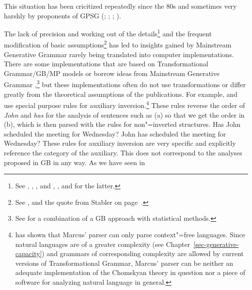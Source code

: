 This situation has been cricitized repeatedly since the 80s and sometimes very harshly by proponents of GPSG 
(\citealp*[]{GKPS85a};
\citealp{Pullum85a,Pullum89b}; \citealp[]{Pullum91b}; \citealp{KP90a}). 

The lack of precision and working out of the details\footnote{
	See \eg {}, , ,  and , ,  and
   for the latter. 
} and the frequent modification of basic assumptions\footnote{
	See \eg {},  and the quote from Stabler on page~\pageref{Zitat-Stabler}.
} has led to insights gained by Mainstream Generative Grammar rarely being translated into computer implementations.
There are some implementations that are based on Transformational Grammar/GB/MP models or borrow ideas from Mainstream
Generative Grammar
\citep*{Petrick65a-u,ZFHW65a,Kay67a,Friedman69a,FBDPM71a-u,Morin73a-u,Marcus80a-u,AC86a,Kuhns86a,Correra87a,Stabler87a,Stabler92a-u,Stabler2001a,KT91a,Fong91a-u,CL92a,Lohnstein93a-u,FC94a,Nordgard94a,Veenstra98a,%
FG2012a%
},\footnote{
  See  for a combination of a GB approach with statistical methods.
}
but these implementations often do not use transformations or differ greatly from the theoretical assumptions of the
publications. For example, \citet[--104]{Marcus80a-u} and
\citet[]{Stabler87a} use special purpose rules for auxiliary inversion.\footnote{
  \citet{NF86a-u,NF87a-u} has shown that Marcus' parser can only parse context"=free languages. Since natural languages
  are of a greater complexity (see Chapter~\ref{sec-generative-capacity}) and grammars of corresponding complexity
  are allowed by current versions of Transformational Grammar, Marcus' parser can be neither an adequate implementation of
  the Chomskyan theory in question nor a piece of software for analyzing natural language in general.
}
These rules reverse the order of \emph{John} and \emph{has} for the analysis of sentences such as (a) so that we get the order in
  (b), which is then parsed with the rules for non"=inverted structures.
\eal
\ex Has John scheduled the meeting for Wednesday?
\ex John has scheduled the meeting for Wednesday?
\zl
These rules for auxiliary inversion are very specific and explicitly reference the category of the auxiliary. This does not correspond
to the analyses proposed in GB in any way. As we have seen in
